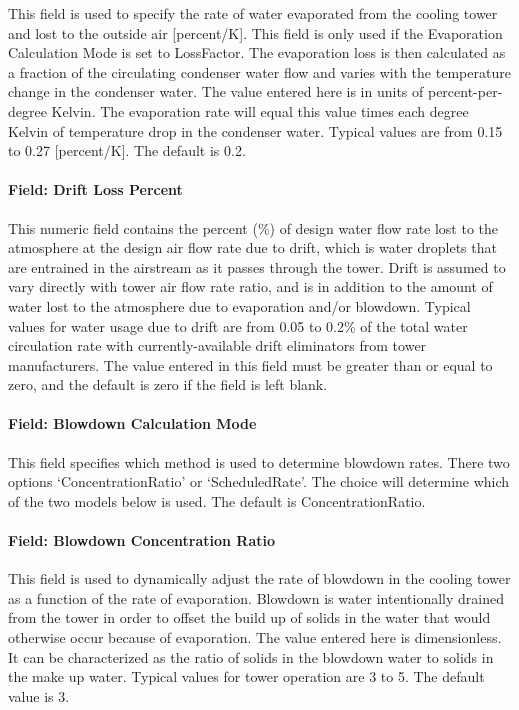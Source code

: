 This field is used to specify the rate of water evaporated from the cooling tower and lost to the outside air {[}percent/K{]}. This field is only used if the Evaporation Calculation Mode is set to LossFactor. The evaporation loss is then calculated as a fraction of the circulating condenser water flow and varies with the temperature change in the condenser water. The value entered here is in units of percent-per-degree Kelvin. The evaporation rate will equal this value times each degree Kelvin of temperature drop in the condenser water. Typical values are from 0.15 to 0.27 {[}percent/K{]}. The default is 0.2.

\paragraph{Field: Drift Loss Percent}\label{field-drift-loss-percent-3}

This numeric field contains the percent (\%) of design water flow rate lost to the atmosphere at the design air flow rate due to drift, which is water droplets that are entrained in the airstream as it passes through the tower. Drift is assumed to vary directly with tower air flow rate ratio, and is in addition to the amount of water lost to the atmosphere due to evaporation and/or blowdown. Typical values for water usage due to drift are from 0.05 to 0.2\% of the total water circulation rate with currently-available drift eliminators from tower manufacturers. The value entered in this field must be greater than or equal to zero, and the default is zero if the field is left blank.

\paragraph{Field: Blowdown Calculation Mode}\label{field-blowdown-calculation-mode-3}

This field specifies which method is used to determine blowdown rates. There two options `ConcentrationRatio' or `ScheduledRate'. The choice will determine which of the two models below is used. The default is ConcentrationRatio.

\paragraph{Field: Blowdown Concentration Ratio}\label{field-blowdown-concentration-ratio-3}

This field is used to dynamically adjust the rate of blowdown in the cooling tower as a function of the rate of evaporation. Blowdown is water intentionally drained from the tower in order to offset the build up of solids in the water that would otherwise occur because of evaporation. The value entered here is dimensionless. It can be characterized as the ratio of solids in the blowdown water to solids in the make up water. Typical values for tower operation are 3 to 5. The default value is 3.

